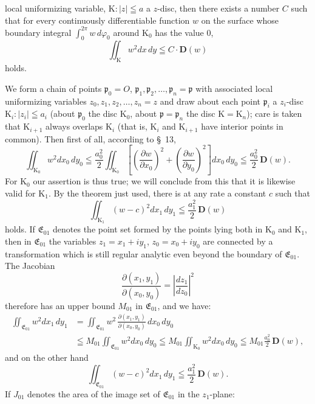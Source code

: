 \documentclass{article}
\begin{document}
local uniformizing variable, $\mathrm{K} : |z| \leqq a$ a $z$-disc, then there exists a number $C$ such that for every continuously differentiable function $w$ on the surface whose boundary integral $\displaystyle\int_0^{2\pi} w\,d\varphi_0$ around $\mathrm{K}_0$ has the value $0$,
\[ \iint_{\mathrm{K}} w^2 dx\,dy \leqq C \cdot \mathbf{D}(w) \]
holds.

We form a chain of points $\mathfrak{p}_0 = O$, $\mathfrak{p}_1, \mathfrak{p}_2, \dots, \mathfrak{p}_n = \mathfrak{p}$ with associated local uniformizing variables $z_0, z_1, z_2, \dots, z_n = z$ and draw about each point $\mathfrak{p}_i$ a $z_i$-disc $\mathrm{K}_i : |z_i| \leqq a_i$ (about $\mathfrak{p}_0$ the disc $\mathrm{K}_0$, about $\mathfrak{p} = \mathfrak{p}_n$ the disc $\mathrm{K} = \mathrm{K}_n$); care is taken that $\mathrm{K}_{i+1}$ always overlaps $\mathrm{K}_i$ (that is, $\mathrm{K}_i$ and $\mathrm{K}_{i+1}$ have interior points in common). Then first of all, according to §~13,
\[ \iint_{\mathrm{K}_0} w^2 dx_0\,dy_0 \leqq \frac{a_0^2}{2} \iint_{\mathrm{K}_0} \left[ \left(\frac{\partial w}{\partial x_0}\right)^2 + \left(\frac{\partial w}{\partial y_0}\right)^2 \right] dx_0\,dy_0 \leqq \frac{a_0^2}{2}\,\mathbf{D}(w). \]
For $\mathrm{K}_0$ our assertion is thus true; we will conclude from this that it is likewise valid for $\mathrm{K}_1$. By the theorem just used, there is at any rate a constant $c$ such that
\[ \iint_{\mathrm{K}_1} (w - c)^2 dx_1\,dy_1 \leqq \frac{a_1^2}{2}\,\mathbf{D}(w) \]
holds. If $\mathfrak{E}_{01}$ denotes the point set formed by the points lying both in $\mathrm{K}_0$ and $\mathrm{K}_1$, then in $\mathfrak{E}_{01}$ the variables $z_1 = x_1 + i y_1$, $z_0 = x_0 + i y_0$ are connected by a transformation which is still regular analytic even beyond the boundary of $\mathfrak{E}_{01}$. The Jacobian
\[ \frac{\partial(x_1, y_1)}{\partial(x_0, y_0)} = \left| \frac{dz_1}{dz_0} \right|^2 \]
therefore has an upper bound $M_{01}$ in $\mathfrak{E}_{01}$, and we have:
\[ \begin{aligned}
\iint_{\mathfrak{E}_{01}} w^2 dx_1\,dy_1 &= \iint_{\mathfrak{E}_{01}} w^2\,\frac{\partial(x_1, y_1)}{\partial(x_0, y_0)}\,dx_0\,dy_0 \\
&\leqq M_{01} \iint_{\mathfrak{E}_{01}} w^2 dx_0\,dy_0 \leqq M_{01} \iint_{\mathrm{K}_0} w^2 dx_0\,dy_0 \leqq M_{01} \frac{a_0^2}{2}\,\mathbf{D}(w),
\end{aligned} \tag{31} \]
and on the other hand
\[ \iint_{\mathfrak{E}_{01}} (w - c)^2 dx_1\,dy_1 \leqq \frac{a_1^2}{2}\,\mathbf{D}(w). \tag{32} \]
If $J_{01}$ denotes the area of the image set of $\mathfrak{E}_{01}$ in the $z_1$-plane:
\end{document}
